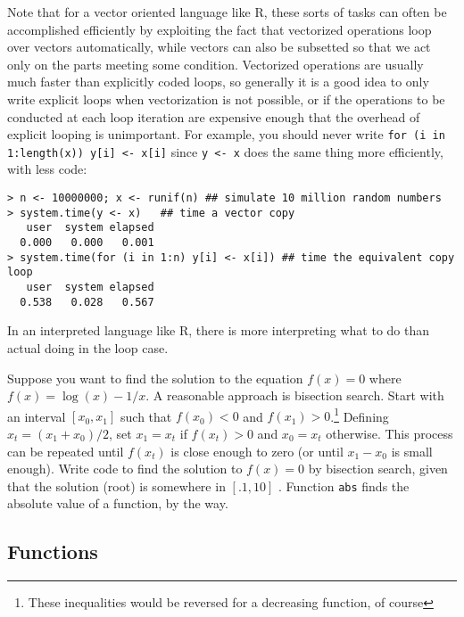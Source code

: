 \documentclass[10pt] {article}
\theoremstyle{definition}
\begin{document}
Note that for a vector oriented language like R, these sorts of tasks can often be accomplished efficiently by exploiting the fact that vectorized operations loop over vectors automatically, while vectors can also be subsetted so that we act only on the parts meeting some condition. Vectorized operations are usually much faster than explicitly coded loops, so generally it is a good idea to only write explicit loops when vectorization is not possible, or if the operations to be conducted at each loop iteration are expensive enough that the overhead of explicit looping is unimportant. For example, you should never write \lstinline+for (i in 1:length(x)) y[i] <- x[i]+ since \lstinline+y <- x+ does the same thing more efficiently, with less code:
\begin{lstlisting}
> n <- 10000000; x <- runif(n) ## simulate 10 million random numbers 
> system.time(y <- x)   ## time a vector copy
   user  system elapsed 
  0.000   0.000   0.001 
> system.time(for (i in 1:n) y[i] <- x[i]) ## time the equivalent copy loop
   user  system elapsed 
  0.538   0.028   0.567
\end{lstlisting}
In an interpreted language like R, there is more interpreting what to do than actual doing in the loop case. 

 Suppose you want to find the solution to the equation $f(x)=0$ where $f(x) = \log(x)-1/x$. A reasonable approach is bisection search. Start with an interval $[x_0,x_1]$ such that $f(x_0)<0$ and $f(x_1)>0$.\footnote{These inequalities would be reversed for a decreasing function, of course} Defining $x_t = (x_1+x_0)/2$, set $x_1 = x_t$ if $f(x_t)>0$ and $x_0=x_t$ otherwise. This process can be repeated until $f(x_t)$ is close enough to zero (or until $x_1-x_0$ is small enough). Write code to find the solution to $f(x)=0$ by bisection search, given that the solution (root) is somewhere in $[.1,10]$ . Function {\tt abs} finds the absolute  
value of a function, by the way.

\subsection{Functions \label{sec:function}}
\end{document}
